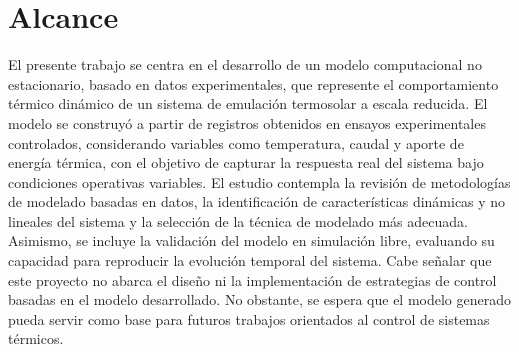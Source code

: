 \documentclass[11pt]{report}
\begin{document}
\section{Alcance}

El presente trabajo se centra en el desarrollo de un modelo computacional no estacionario, basado en datos experimentales, que represente el comportamiento térmico dinámico de un sistema de emulación termosolar a escala reducida. El modelo se construyó a partir de registros obtenidos en ensayos experimentales controlados, considerando variables como temperatura, caudal y aporte de energía térmica, con el objetivo de capturar la respuesta real del sistema bajo condiciones operativas variables. 
El estudio contempla la revisión de metodologías de modelado basadas en datos, la identificación de características dinámicas y no lineales del sistema y la selección de la técnica de modelado más adecuada. Asimismo, se incluye la validación del modelo en simulación libre, evaluando su capacidad para reproducir la evolución temporal del sistema. Cabe señalar que este proyecto no abarca el diseño ni la implementación de estrategias de control basadas en el modelo desarrollado. No obstante, se espera que el modelo generado pueda servir como base para futuros trabajos orientados al control de sistemas térmicos.
\end{document}
